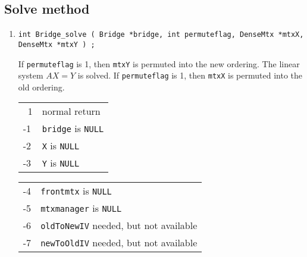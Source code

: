 \subsection{Solve method}
\label{subsection:Bridge:proto:solve}
\par
\begin{enumerate}
\item
\begin{verbatim}
int Bridge_solve ( Bridge *bridge, int permuteflag, DenseMtx *mtxX, DenseMtx *mtxY ) ;
\end{verbatim}
If \texttt{permuteflag} is 1, then \texttt{mtxY} is permuted into
the new ordering.
The linear system $AX = Y$ is solved.
If \texttt{permuteflag} is 1, then \texttt{mtxX} is permuted into
the old ordering.
\par {}
\begin{center}
\begin{tabular}{ll}
~1 & normal return \\
-1 & \texttt{bridge} is \texttt{NULL} \\
-2 & \texttt{X} is \texttt{NULL} \\
-3 & \texttt{Y} is \texttt{NULL} \\
\end{tabular}
\begin{tabular}{ll}
-4 & \texttt{frontmtx} is \texttt{NULL} \\
-5 & \texttt{mtxmanager} is \texttt{NULL} \\
-6 & \texttt{oldToNewIV} needed, but not available \\
-7 & \texttt{newToOldIV} needed, but not available \\
\end{tabular}
\end{center}
\end{enumerate}
